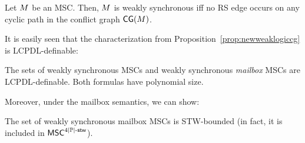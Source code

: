 \documentclass{article}
\begin{document}
\begin{proposition}\label{prop:newweaklogiccg}
Let $M$ be an MSC. Then, $M$ is weakly synchronous iff no RS edge occurs on any cyclic path in the conflict graph $\mathsf{CG}(M)$.
\end{proposition}

It is easily seen that the characterization from
Proposition~\ref{prop:newweaklogiccg} is LCPDL-definable:

\begin{corollary}\label{cor:weak-sync-lcpdl}
The sets of weakly synchronous MSCs and weakly synchronous \emph{mailbox} MSCs are LCPDL-definable.
Both formulas have polynomial size.
\end{corollary}

Moreover, under the mailbox semantics, we can show:

\begin{proposition}\label{prop:new-weak-logic-bounded}
The set of weakly synchronous mailbox MSCs is
STW-bounded (in fact, it is included in $\mathsf{MSC}^{4|\mathbb{P}|\textup{-}\mathsf{stw}}$).
\end{proposition}
\end{document}
